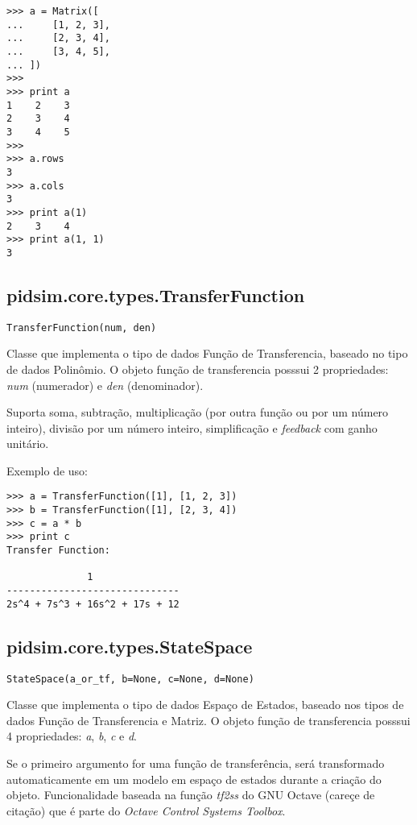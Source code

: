     \begin{verbatim}
>>> a = Matrix([
...     [1, 2, 3],
...     [2, 3, 4],
...     [3, 4, 5],
... ])
>>>
>>> print a
1    2    3
2    3    4
3    4    5
>>>
>>> a.rows
3
>>> a.cols
3
>>> print a(1)
2    3    4
>>> print a(1, 1)
3\end{verbatim}

\subsection{pidsim.core.types.TransferFunction}

    \begin{verbatim}
TransferFunction(num, den)\end{verbatim}

    Classe que implementa o tipo de dados Função de Transferencia, baseado
    no tipo de dados Polinômio. O objeto função de transferencia posssui
    2 propriedades: \textit{num} (numerador) e \textit{den} (denominador).
    
    Suporta soma, subtração, multiplicação (por outra função ou por um
    número inteiro), divisão por um número inteiro, simplificação e
    \textit{feedback} com ganho unitário.
    
    Exemplo de uso:
    
    \begin{verbatim}
>>> a = TransferFunction([1], [1, 2, 3])
>>> b = TransferFunction([1], [2, 3, 4])
>>> c = a * b
>>> print c
Transfer Function:

              1               
------------------------------
2s^4 + 7s^3 + 16s^2 + 17s + 12\end{verbatim}

\subsection{pidsim.core.types.StateSpace}

    \begin{verbatim}
StateSpace(a_or_tf, b=None, c=None, d=None)
    \end{verbatim}

    Classe que implementa o tipo de dados Espaço de Estados, baseado
    nos tipos de dados Função de Transferencia e Matriz. O objeto função
    de transferencia posssui 4 propriedades: \textit{a}, \textit{b},
    \textit{c} e \textit{d}.
    
    Se o primeiro argumento for uma função de transferência, será transformado
    automaticamente em um modelo em espaço de estados durante a criação do
    objeto. Funcionalidade baseada na função \textit{tf2ss} do GNU Octave
    (careçe de citação) que é parte do \textit{Octave Control Systems Toolbox}.
    
